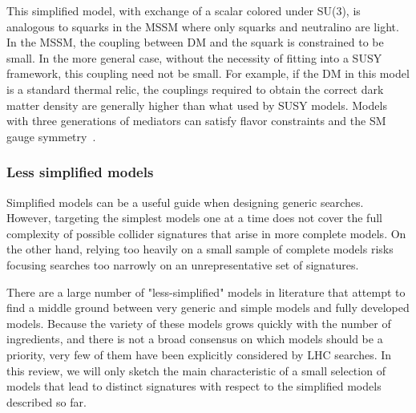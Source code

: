 This simplified model, with exchange of a scalar colored under SU(3), is analogous to squarks in the MSSM where only squarks and neutralino are light. In the MSSM, the coupling between DM and the squark is constrained to be small. In the more general case, without the necessity of fitting into a SUSY framework, this coupling need not be small. For example, if the DM in this model is a standard thermal relic, the couplings required to obtain the correct dark matter density are generally higher than what used by SUSY models. Models with three generations of mediators can satisfy flavor constraints and the SM gauge symmetry~\cite{Ko:2016zxg}. 


\subsubsection{Less simplified models}
\label{sec:LessSimplifiedModels}


Simplified models can be a useful guide when designing generic searches. However, targeting the simplest models one at a time does not cover the full complexity of possible collider signatures that arise in more complete models. On the other hand, relying too heavily on a small sample of complete models risks focusing searches too narrowly on an unrepresentative set of signatures.

There are a large number of "less-simplified" models in literature that attempt to find a middle ground between very generic and simple models and fully developed models. Because the variety of these models grows quickly with the number of ingredients, and there is not a broad consensus on which models should be a priority, very few of them have been explicitly considered by LHC searches. In this review, we will only sketch the main characteristic of a small selection of models that lead to distinct signatures with respect to the simplified models described so far. 

